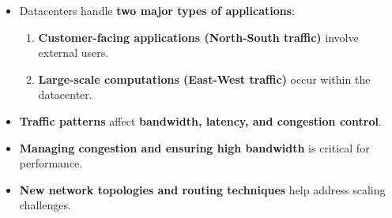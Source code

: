 \highspace
\begin{takeawaysbox}
    \begin{itemize}
        \item Datacenters handle \textbf{two major types of applications}:
        \begin{enumerate}
            \item \textbf{Customer-facing applications (North-South traffic)} involve external users.
            \item \textbf{Large-scale computations (East-West traffic)} occur within the datacenter.
        \end{enumerate}  
        \item \textbf{Traffic patterns} affect \textbf{bandwidth, latency, and congestion control}.  
        \item \textbf{Managing congestion and ensuring high bandwidth} is critical for performance.  
        \item \textbf{New network topologies and routing techniques} help address scaling challenges.  
    \end{itemize}
\end{takeawaysbox}